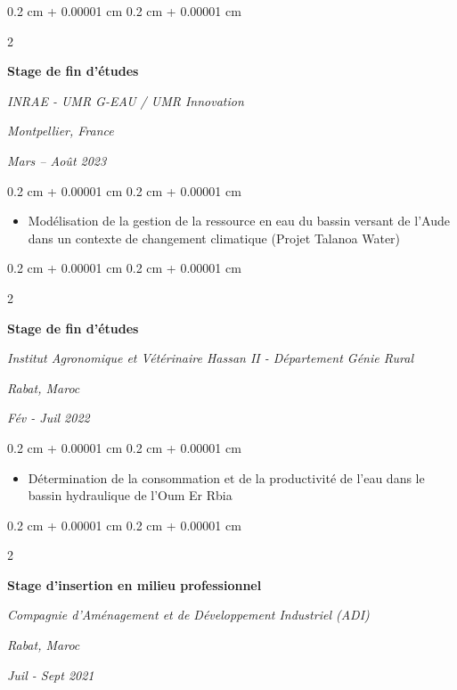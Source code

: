 \documentclass[10pt, letterpaper]{article}
\newenvironment{highlights}{
  \begin{itemize}[
    topsep=0.10 cm,
    parsep=0.10 cm,
    partopsep=0pt,
    itemsep=0pt,
    leftmargin=0.4 cm + 10pt
  ]
}{
  \end{itemize}
} %
\newenvironment{onecolentry}{
  \begin{adjustwidth}{
    0.2 cm + 0.00001 cm
  }{
    0.2 cm + 0.00001 cm
  }
}{
  \end{adjustwidth}
} %
\newenvironment{twocolentry}[2][]{
  \onecolentry
  \def\secondColumn{#2}
  \setcolumnwidth{\fill, 4.6 cm}
  \begin{paracol}{2}
}{
  \switchcolumn \raggedleft \secondColumn
  \end{paracol}
  \endonecolentry
} %
\begin{document}
  \begin{twocolentry} {
    \textit{Montpellier, France}
    
    \textit{Mars – Août 2023}
  } {
    \textbf{Stage de fin d'études}
    
    \textit{INRAE - UMR G-EAU / UMR Innovation}
  }
  \end{twocolentry}

  \vspace{0.10 cm}

  \begin{onecolentry}
    \begin{highlights}
      \item Modélisation de la gestion de la ressource en eau du bassin versant de
      l'Aude dans un contexte de changement climatique (Projet Talanoa Water)
    \end{highlights}
  \end{onecolentry}

  \vspace{0.1 cm}

  \begin{twocolentry}
    {
      \textit{Rabat, Maroc}

      \textit{Fév - Juil 2022}
    }
    {
      \textbf{Stage de fin d'études}

      \textit{Institut Agronomique et Vétérinaire Hassan II - Département
      Génie Rural}
    }
  \end{twocolentry}

  \vspace{0.10 cm}

  \begin{onecolentry}
    \begin{highlights}
      \item Détermination de la consommation et de la productivité de l'eau
      dans le bassin hydraulique de l'Oum Er Rbia
    \end{highlights}
  \end{onecolentry}

  \vspace{0.1 cm}

  \begin{twocolentry}
    {
      \textit{Rabat, Maroc}

      \textit{Juil - Sept 2021}
    }
    {
      \textbf{Stage d'insertion en milieu professionnel}

      \textit{Compagnie d'Aménagement et de Développement Industriel (ADI)}
    }
  \end{twocolentry}
\end{document}
